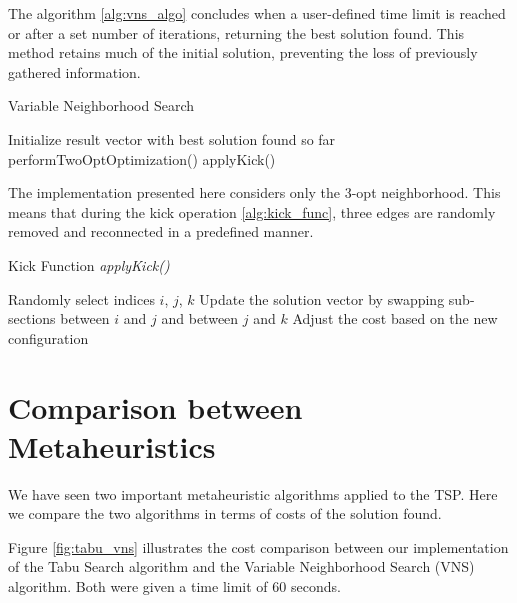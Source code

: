 The algorithm \ref{alg:vns_algo} concludes when a user-defined time limit is reached or after a set number of iterations, returning the best solution found. This method retains much of the initial solution, preventing the loss of previously gathered information.

\begin{algorithm}[H]
    \caption{Variable Neighborhood Search}
    \label{alg:vns_algo}
    \begin{spacing}{1.2} %
        \BlankLine
        Initialize result vector with best solution found so far\;
        {
            performTwoOptOptimization()\;
            {
                applyKick()\;
            }
        }
        \BlankLine
    \end{spacing}
\end{algorithm}

The implementation presented here considers only the 3-opt neighborhood. This means that during the kick operation \ref{alg:kick_func}, three edges are randomly removed and reconnected in a predefined manner.

\begin{algorithm}[H]
    \caption{Kick Function \textit{applyKick()}}
    \label{alg:kick_func}
    \begin{spacing}{1.2} %
        Randomly select indices $i$, $j$, $k$\;
        Update the solution vector by swapping sub-sections between $i$ and $j$ and between $j$ and $k$\;
        Adjust the cost based on the new configuration\;
        \BlankLine
    \end{spacing}
\end{algorithm}

\section{Comparison between Metaheuristics}
We have seen two important metaheuristic algorithms applied to the TSP. Here we compare the two algorithms in terms of costs of the solution found.

Figure \ref{fig:tabu_vns} illustrates the cost comparison between our implementation of the Tabu Search algorithm and the Variable Neighborhood Search (VNS) algorithm. Both were given a time limit of 60 seconds.

